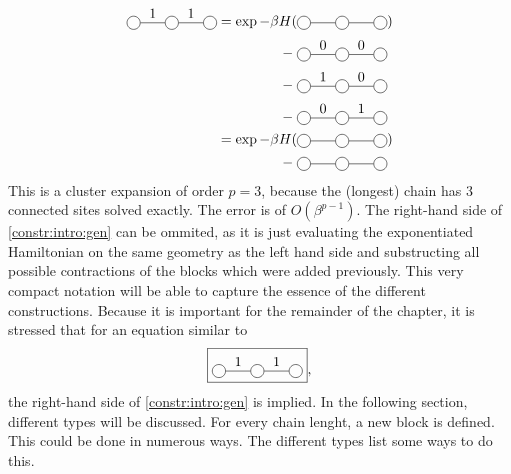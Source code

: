 \begin{equation}\label{constr:intro:gen}
  \begin{split}
    \mpob{3}{ {0,1,1,0}  }{}{}{}{{,,,}}  = \exp  -\beta H( &\mpob{3}{ {,,,} }{}{}{}{{,,}})  \\
    - \;&\mpob{3}{ {0,0,0,0}  }{}{}{}{{,,,}}\\
    - \; &\mpob{3}{ {0,1,0,0}  }{}{}{}{{,,,}}\\
    - \; &\mpob{3}{ {0,0,1,0}  }{}{}{}{{,,,}}\\
    =\exp  -\beta H( &\mpob{3}{ {,,,} }{}{}{}{{,,}})\\
    - \; &\mpob{3}{ {,,,}  }{}{}{}{{,,,}}\\
  \end{split}
\end{equation}
This is a cluster expansion of order $p=3$, because the (longest) chain has  3 connected sites solved exactly. The error is of $O\left(  \beta^{p-1}  \right)$. The right-hand side of \cref{constr:intro:gen} can be ommited, as it is just evaluating the exponentiated Hamiltonian on the same geometry as the left hand side and substructing all possible contractions of the blocks which were added previously. This very compact notation will be able to capture the essence of the different constructions. Because it is important for the remainder of the chapter, it is stressed that for an equation similar to
\begin{equation}
  \boxed{\mpob{3}{ {0,1,1,0}  }{}{}{}{{,,,}} },
\end{equation}
the right-hand side of \cref{constr:intro:gen} is implied. In the following section, different types will be discussed. For every chain lenght, a new block is defined. This could be done in numerous ways. The different types list some ways to do this.